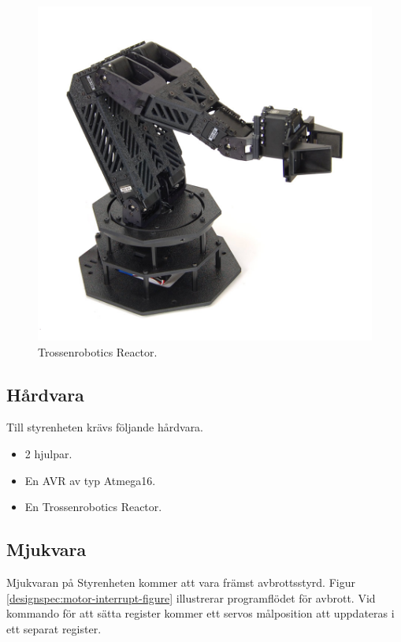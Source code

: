 \begin{figure}[h]
\center
\includegraphics[scale=0.35]{arm}
\caption{Trossenrobotics Reactor.}
\end{figure}

\subsection{Hårdvara}

Till styrenheten krävs följande hårdvara.
\begin{itemize}
\item{2 hjulpar.}
\item{En AVR av typ Atmega16.}
\item{En Trossenrobotics Reactor.}
\end{itemize}

\subsection{Mjukvara}

Mjukvaran på Styrenheten kommer att vara främst avbrottsstyrd. Figur \ref{designspec:motor-interrupt-figure} illustrerar programflödet för avbrott. Vid kommando för att sätta register kommer ett servos målposition att uppdateras i ett separat register.  \\

